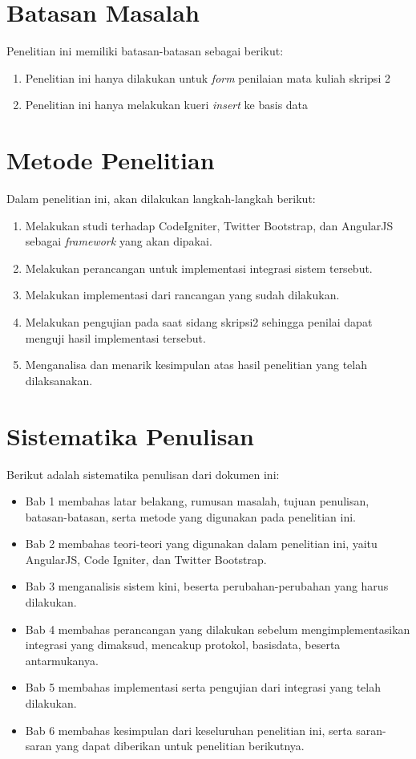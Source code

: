 \section{Batasan Masalah}
\label{sec: batasanMasalah}
	
	Penelitian ini memiliki batasan-batasan sebagai berikut:
	
	\begin{enumerate}
		\item Penelitian ini hanya dilakukan untuk \textit{form} penilaian mata kuliah skripsi 2
		\item Penelitian ini hanya melakukan kueri \textit{insert} ke basis data
	\end{enumerate}
	
\section{Metode Penelitian}
\label{sec: metodePenelitian}

Dalam penelitian ini, akan dilakukan langkah-langkah berikut:

\begin{enumerate}
	\item Melakukan studi terhadap CodeIgniter, Twitter Bootstrap, dan AngularJS sebagai \textit{framework} yang akan dipakai.
	\item Melakukan perancangan untuk implementasi integrasi sistem tersebut.
	\item Melakukan implementasi dari rancangan yang sudah dilakukan.
	\item Melakukan pengujian pada saat sidang skripsi2 sehingga penilai dapat menguji hasil implementasi tersebut.
	\item Menganalisa dan menarik kesimpulan atas hasil penelitian yang telah dilaksanakan.
\end{enumerate}
	
\section{Sistematika Penulisan}
\label{sec: sistematikaPenulisan}

Berikut adalah sistematika penulisan dari dokumen ini:

\begin{itemize}
	\item Bab 1 membahas latar belakang, rumusan masalah, tujuan penulisan, batasan-batasan, serta metode yang digunakan pada penelitian ini.
	\item Bab 2 membahas teori-teori yang digunakan dalam penelitian ini, yaitu AngularJS, Code Igniter, dan Twitter Bootstrap.
	\item Bab 3 menganalisis sistem kini, beserta perubahan-perubahan yang harus dilakukan.
	\item Bab 4 membahas perancangan yang dilakukan sebelum mengimplementasikan integrasi yang dimaksud, mencakup protokol, basisdata, beserta antarmukanya.
	\item Bab 5 membahas implementasi serta pengujian dari integrasi yang telah dilakukan.
	\item Bab 6 membahas kesimpulan dari keseluruhan penelitian ini, serta saran-saran yang dapat diberikan untuk penelitian berikutnya.
\end{itemize}